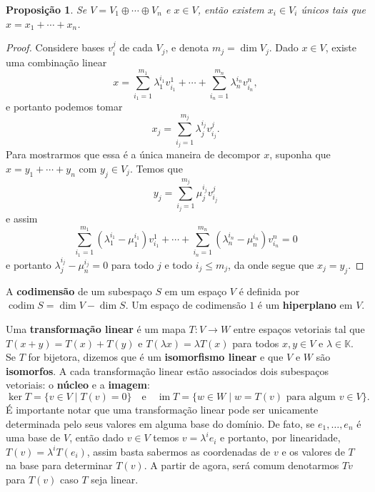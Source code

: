 \documentclass{article}
\newtheorem{proposition}[definition]{Proposição}
\DeclareMathOperator{\im}{im}
\DeclareMathOperator{\codim}{codim}
\begin{document}
\begin{proposition}
    Se $V = V_1 \oplus \cdots \oplus V_n$ e $x \in V$, então existem $x_i \in V_i$ únicos tais que $x = x_1 + \cdots + x_n$.
\end{proposition}
\begin{proof}
    Considere bases $v_i^j$ de cada $V_j$, e denota $m_j = \dim V_j$. Dado $x \in V$, existe uma combinação linear \begin{equation}
        x = \sum_{i_1 = 1}^{m_1} \lambda^{i_1}_1 v_{i_1}^1 + \cdots + \sum_{i_n = 1}^{m_n} \lambda^{i_n}_n v_{i_n}^n,
    \end{equation} e portanto podemos tomar \begin{equation}
        x_j = \sum_{i_j = 1}^{m_j} \lambda^{i_j}_j v_{i_j}^j.
    \end{equation} Para mostrarmos que essa é a única maneira de decompor $x$, suponha que $x = y_1 + \cdots + y_n$ com $y_j \in V_j$. Temos que \begin{equation}
        y_j = \sum_{i_j = 1}^{m_j} \mu_j^{i_j} v_{i_j}^j
    \end{equation} e assim \begin{equation}
        \sum_{i_1 = 1}^{m_1} (\lambda^{i_1}_1 - \mu^{i_1}_1) v_{i_1}^1 + \cdots + \sum_{i_n = 1}^{m_n} (\lambda^{i_n}_n - \mu^{i_n}_n) v_{i_n}^n = 0
    \end{equation} e portanto $\lambda^{i_j}_j - \mu^{i_j}_n = 0$ para todo $j$ e todo $i_j \leq m_j$, da onde segue que $x_j = y_j$.    
\end{proof}

A \textbf{codimensão} de um subespaço $S$ em um espaço $V$ é definida por $\codim S = \dim V - \dim S$. Um espaço de codimensão $1$ é um \textbf{hiperplano} em $V$.

Uma \textbf{transformação linear} é um mapa $T \colon V \to W$ entre espaços vetoriais tal que $T(x + y) = T(x) + T(y)$ e $T(\lambda x) = \lambda T(x)$ para todos $x, y \in V$ e $\lambda \in \mathbb{K}$. Se $T$ for bijetora, dizemos que é um \textbf{isomorfismo linear} e que $V$ e $W$ são \textbf{isomorfos}. A cada transformação linear estão associados dois subespaços vetoriais: o \textbf{núcleo} e a \textbf{imagem}: \begin{equation}
    \ker T = \{v \in V \mid T(v) = 0\} \quad \text{e} \quad \im T = \{w \in W \mid w = T(v) \text{ para algum } v \in V\}.
\end{equation} É importante notar que uma transformação linear pode ser unicamente determinada pelo seus valores em alguma base do domínio. De fato, se $e_1, \dots, e_n$ é uma base de $V$, então dado $v \in V$ temos $v = \lambda^i e_i$ e portanto, por linearidade, $T(v) = \lambda^i T(e_i)$, assim basta sabermos as coordenadas de $v$ e os valores de $T$ na base para determinar $T(v)$. A partir de agora, será comum denotarmos $Tv$ para $T(v)$ caso $T$ seja linear.
\end{document}
